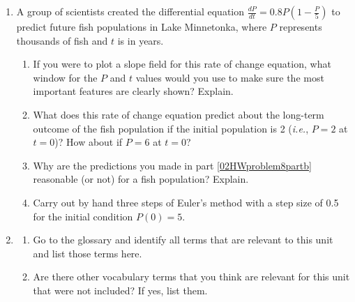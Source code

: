 \begin{enumerate}
\clearpage

\item A group of scientists created the differential equation $\displaystyle\frac{dP}{dt}=0.8P\left(1-\frac{P}{5}\right)$  to predict future fish populations in Lake Minnetonka, where $P$ represents thousands of fish and $t$ is in years. \label{02HWproblem8}

\begin{enumerate}
\item	If you were to plot a slope field for this rate of change equation, what window for the $P$ and $t$ values would you use to make sure the most important features are clearly shown? Explain. \label{02HWproblem8parta}
\item	What does this rate of change equation predict about the long-term outcome of the fish population if the initial population is 2 ({\em i.e.}, $P = 2$ at $t = 0$)? How about if $P = 6$ at $t = 0$? \label{02HWproblem8partb}
\item	Why are the predictions you made in part \ref{02HWproblem8partb} reasonable (or not) for a fish population? Explain. \label{02HWproblem8partc}
\item	Carry out by hand three steps of Euler's method with a step size of 0.5 for the initial condition $P(0) = 5$. \label{02HWproblem8partd}
\end{enumerate}

\item
\begin{enumerate}
\item Go to the glossary and identify all terms that are relevant to this unit and list those terms here.
\item Are there other vocabulary terms that you think are relevant for this unit that were not included? If yes, list them.
\end{enumerate}

\end{enumerate}
